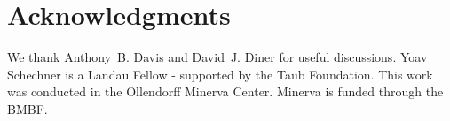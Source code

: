 \documentclass[10pt,letterpaper]{article}
\begin{document}

\section*{Acknowledgments}
\label{sec:acknowledgments}

We thank Anthony~B. Davis and David~J. Diner for useful
discussions. Yoav Schechner is a Landau Fellow - supported by the Taub
Foundation. This work was conducted in the Ollendorff Minerva
Center. Minerva is funded through the BMBF.
\end{document}
